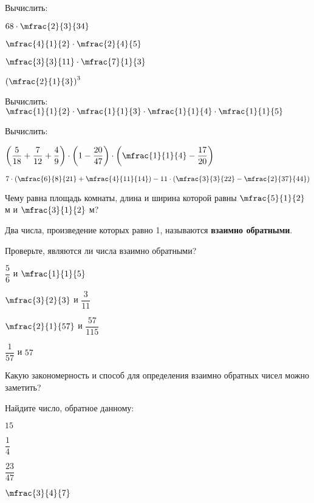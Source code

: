 %
%
%
%
\begin{class}[number=1]
	\begin{listofex}
		\item Вычислить:
		\begin{enumcols}[itemcolumns=4]
			\item \( 68\cdot\mfrac{2}{3}{34} \)
			\item \( \mfrac{4}{1}{2}\cdot\mfrac{2}{4}{5} \)
			\item \( \mfrac{3}{3}{11}\cdot\mfrac{7}{1}{3} \)
			\item \( \left( \mfrac{2}{1}{3} \right)^3 \)
		\end{enumcols}
		\item Вычислить: \( \mfrac{1}{1}{2}\cdot\mfrac{1}{1}{3}\cdot\mfrac{1}{1}{4}\cdot\mfrac{1}{1}{5} \)
		\item Вычислить: 
		\begin{enumcols}[itemcolumns=2]
			\item \( \left( \dfrac{5}{18}+\dfrac{7}{12}+\dfrac{4}{9} \right)\cdot\left( 1-\dfrac{20}{47} \right)\cdot\left( \mfrac{1}{1}{4}-\dfrac{17}{20} \right) \)
			\item \( 7\cdot\left( \mfrac{6}{8}{21}+\mfrac{4}{11}{14} \right)-11\cdot\left( \mfrac{3}{3}{22}-\mfrac{2}{37}{44} \right) \)
		\end{enumcols}
		\item Чему равна площадь комнаты, длина и ширина которой равны \( \mfrac{5}{1}{2} \) м и \( \mfrac{3}{1}{2} \) м?
	\end{listofex}
	\begin{definit}
		Два числа, произведение которых равно 1, называются \textbf{взаимно обратными}.
	\end{definit}
	\begin{listofex}[resume]
	\item Проверьте, являются ли числа взаимно обратными?
	\begin{enumcols}[itemcolumns=4]
		\item \( \dfrac{5}{6} \) и \( \mfrac{1}{1}{5} \)
		\item \( \mfrac{3}{2}{3} \) и \( \dfrac{3}{11} \)
		\item \( \mfrac{2}{1}{57} \) и \( \dfrac{57}{115} \)
		\item \( \dfrac{1}{57} \) и \( 57 \)
	\end{enumcols}
	Какую закономерность и способ для определения взаимно обратных чисел можно заметить?
	\item Найдите число, обратное данному:
	\begin{enumcols}[itemcolumns=4]
		\item \( 15 \)
		\item \( \dfrac{1}{4} \)
		\item \( \dfrac{23}{47} \)
		\item \( \mfrac{3}{4}{7} \)
	\end{enumcols}
	\end{listofex}
\end{class}
